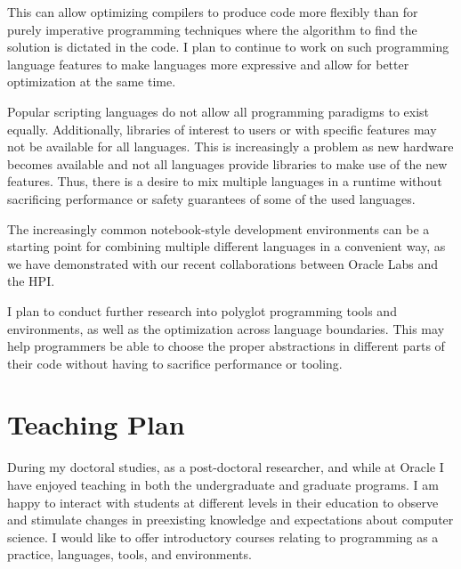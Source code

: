 \documentclass[11pt,a4paper,sans]{moderncv} %
\begin{document}
\begin{refsection}[plan]
\begin{description}
    This can allow optimizing compilers to produce code more flexibly than for
    purely imperative programming techniques where the algorithm to find the
    solution is dictated in the code. I plan to continue to work on such
    programming language features to make languages more expressive and allow
    for better optimization at the same time.
  \item[Multi-language Optimization and Tooling] Popular scripting languages do
    not allow all programming paradigms to exist equally. Additionally,
    libraries of interest to users or with specific features may not be
    available for all languages. This is increasingly a problem as new hardware
    becomes available and not all languages provide libraries to make use of the
    new features. Thus, there is a desire to mix multiple languages in a runtime
    without sacrificing performance or safety guarantees of some of the used
    languages.

    The increasingly common notebook-style development environments can be a
    starting point for combining multiple different languages in a convenient
    way, as we have demonstrated with
    \cite{DBLP:journals/programming/NiephausFPHT18} our recent collaborations
    between Oracle Labs and the HPI.

    I plan to conduct further research into polyglot programming tools and
    environments, as well as the optimization across language boundaries. This
    may help programmers be able to choose the proper abstractions in different
    parts of their code without having to sacrifice performance or tooling.
  \end{description}

  \printbibliography[prefixnumbers=P,resetnumbers,heading=none]
\end{refsection}

\clearpage

\section{Teaching Plan}
\label{sec:teaching}

During my doctoral studies, as a post-doctoral researcher, and while at Oracle I
have enjoyed teaching in both the undergraduate and graduate programs. I am
happy to interact with students at different levels in their education to
observe and stimulate changes in preexisting knowledge and expectations about
computer science. I would like to offer introductory courses relating to
programming as a practice, languages, tools, and environments.
\end{document}
